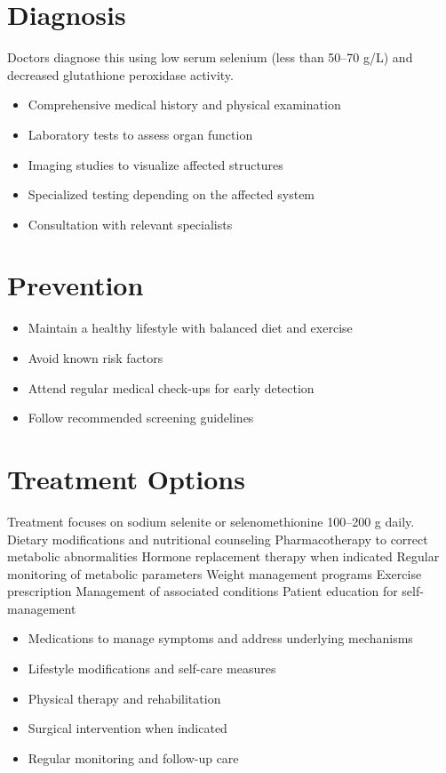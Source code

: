 \section{Diagnosis}
Doctors diagnose this using low serum selenium (less than 50--70 \textmu g/L) and decreased glutathione peroxidase activity.

\begin{itemize}[noitemsep]
  \item Comprehensive medical history and physical examination
  \item Laboratory tests to assess organ function
  \item Imaging studies to visualize affected structures
  \item Specialized testing depending on the affected system
  \item Consultation with relevant specialists
\end{itemize}
\section{Prevention}
\begin{itemize}[noitemsep]
  \item Maintain a healthy lifestyle with balanced diet and exercise
  \item Avoid known risk factors
  \item Attend regular medical check-ups for early detection
  \item Follow recommended screening guidelines
\end{itemize}
\section{Treatment Options}
Treatment focuses on sodium selenite or selenomethionine 100--200 \textmu g daily. Dietary modifications and nutritional counseling Pharmacotherapy to correct metabolic abnormalities Hormone replacement therapy when indicated Regular monitoring of metabolic parameters Weight management programs Exercise prescription Management of associated conditions Patient education for self-management

\begin{itemize}[noitemsep]
  \item Medications to manage symptoms and address underlying mechanisms
  \item Lifestyle modifications and self-care measures
  \item Physical therapy and rehabilitation
  \item Surgical intervention when indicated
  \item Regular monitoring and follow-up care
\end{itemize}
